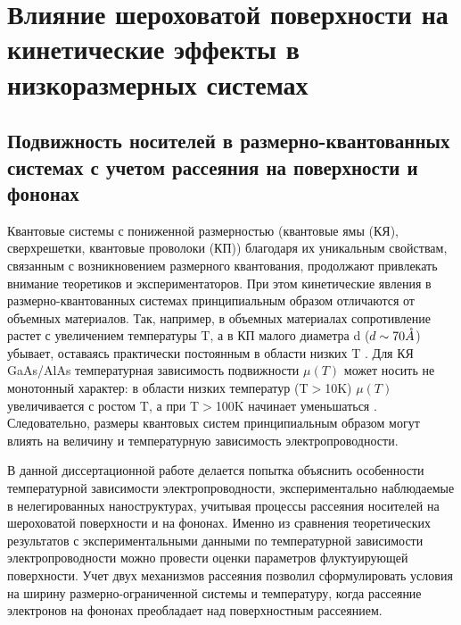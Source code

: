 \chapter{Влияние шероховатой поверхности на кинетические эффекты в низкоразмерных системах} \label{chapt3}

\section{ Подвижность носителей в размерно-квантованных системах с учетом рассеяния на поверхности и фононах}

Квантовые системы с пониженной размерностью (квантовые ямы (КЯ), сверхрешетки, квантовые проволоки (КП)) благодаря их уникальным свойствам, связанным с возникновением размерного квантования, продолжают привлекать внимание теоретиков и экспериментаторов. При этом кинетические явления в размерно-квантованных системах принципиальным образом отличаются от объемных материалов. Так, например, в объемных материалах сопротивление растет с увеличением температуры T, а в КП малого диаметра d ($d \sim 70 \AA$) убывает, оставаясь практически постоянным в области низких T \cite{Lin2000,Lin2003,Heremans1998,Zhang2000,Heremans2000}. Для КЯ GaAs/AlAs температурная зависимость подвижности $\mu (T)$ может носить не монотонный характер: в области низких температур (T$>$10K) $\mu (T)$ увеличивается с ростом T, а при T$>$100K начинает уменьшаться \cite{Lin2000,Sakaki1987}. Следовательно, размеры квантовых систем принципиальным образом могут влиять на величину и температурную зависимость электропроводности.

В данной диссертационной работе делается попытка объяснить особенности температурной зависимости электропроводности, экспериментально наблюдаемые в нелегированных наноструктурах, учитывая процессы рассеяния носителей на шероховатой поверхности и на фононах. Именно из сравнения теоретических результатов с экспериментальными данными по температурной зависимости электропроводности можно провести оценки параметров флуктуирующей поверхности. Учет двух механизмов рассеяния позволил сформулировать условия на ширину размерно-ограниченной системы и температуру, когда рассеяние электронов на фононах преобладает над поверхностным рассеянием.

